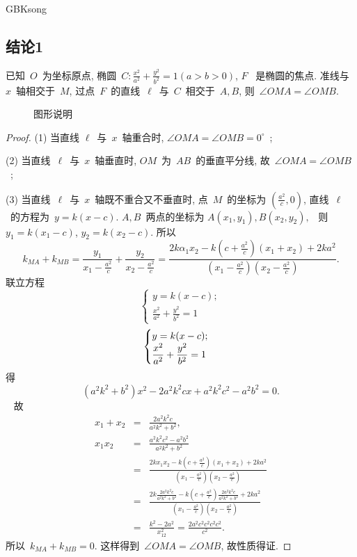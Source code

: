 \documentclass[a4paper, 12pt, twoside]{ctexart}
\begin{document}
\begin{CJK*}{GBK}{song}
\subsection{结论1}
    \begin{propt}\label{propt1}
    已知~$O$~为坐标原点,  椭圆~$C:  \frac{x^2}{a^2}+\frac{y^2}{b^2}=1(a>b>0)$, $F$~ 是椭圆的焦点. 准线与~$x$~轴相交于~$M$, 过点~$F$~的直线~$\ell$~与~$C$~相交于~$A,B$, 则~$\angle OMA=\angle OMB$.
    \end{propt}
    \begin{figure}
    \centering
    \caption{\label{fig3} 图形说明}
    \end{figure}
    \begin{proof}
    (1) 当直线 $\ell$~与~$x$~轴重合时, $\angle O M A=\angle O M B=0^{\circ}$~;

    (2) 当直线~$\ell$~与~$x$~轴垂直时, $OM$~为~$AB$~的垂直平分线, 故~$\angle O M A=\angle O M B$~;

    (3) 当直线~$\ell$~与~$x$~轴既不重合又不垂直时, 点~$M$~的坐标为 $(\frac{a^2}c,0)$, 直线~$\ell$~的方程为~$y=k(x-c)$. $A,B$~两点的坐标为 $A(x_1, y_1), B(x_2,y_2),$~ 则~$y_1=k(x_1-c)$, $ y_2=k(x_2-c)$. 所以
    $$k_{M A}+k_{MB} =\frac{y_{1}}{x_1-\frac{a^2}{c}} +\frac{y_{2}}{x_2-\frac{a^2}{c}}=\frac{2 k \alpha_{1} x_2-k\left(c+\frac{a^2}{c}\right)\left(x_1+x_2\right)+2 k a^2}{\left(x_1-\frac{a^2}{c}\right)\left(x_2-\frac{a^2}{c}\right)}.$$
    联立方程
        $$~\left\{\!\!\!\begin{array}{l}
            y=k(x-c); \\
            \frac{x^2}{a^2}+\frac{y^2}{b^2}=1
        \end{array}\right.~$$
        $$\begin{cases}
          y=k(x-c); \\
          \displaystyle\frac{x^2}{a^2}+\frac{y^2}{b^2}=1
        \end{cases}$$
    得
        $$~(a^2 k^2+b^2)x^2-2 a^2 k^2cx+a^2 k^2c^2-a^2b^2=0.~$$~
    故
        \begin{eqnarray*}
            x_1+x_2&=&\frac{2a^2k^2c}{a^2k^2+b^2},\\
            x_1x_2&=&
                \frac{a^2 k^2 c^2-a^2 b^2}{a^2 k^2+b^2} \\
                &=&\frac{2 k x_1 x_2-k\left(c+\frac{a^2}{c}\right)\left(x_1+x_2\right)+2 ka^2}{\left(x_1-\frac{a^2}{c}\right)\left(x_2-\frac{a^2}{c}\right)} \\
                &=&\frac{2 k \frac{2 a^2 k^2 c}{a^2 k^2+b^2}-k\left(c+\frac{a^2}{c}\right) \frac{2 a^2 k^2 c}{a^2 k^2+b^2}+2 k a^2}{\left(x_1-\frac{a^2}{c}\right)\left(x_2-\frac{a^2}{c}\right)} \\
            &=&\frac{k^2-2 a^2}{x_{12}^2}=\frac{2 a^2 c^2 c^2 c^2 c^2}
            {c^2}.
        \end{eqnarray*}
    所以~$k_{M A}+k_{M B}=0$. 这样得到~$\angle O M A=\angle O M B$, 故性质得证.
\end{proof}


\end{CJK*}
\end{document}

